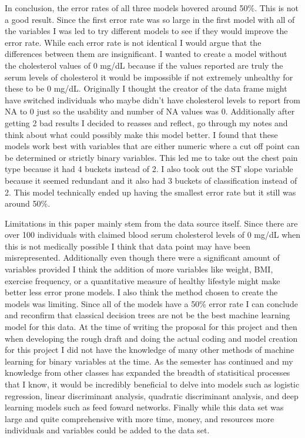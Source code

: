 \documentclass[12pt]{article}
\begin{document}
In conclusion, the error rates of all three models hovered around 50\%. This is not a good result. Since the first error rate was so large in the first model with all of the variables I was led to try different models to see if they would improve the error rate. While each error rate is not identical I would argue that the differences between them are insignificant. I wanted to create a model without the cholesterol values of 0 mg/dL because if the values reported are truly the serum levels of cholesterol it would be impossible if not extremely unhealthy for these to be 0 mg/dL. Originally I thought the creator of the data frame might have switched individuals who maybe didn’t have cholesterol levels to report from NA to 0 just so the usability and number of NA values was 0. Additionally after getting 2 bad results I decided to reasses and reflect, go through my notes and think about what could possibly make this model better. I found that these models work best with variables that are either numeric where a cut off point can be determined or strictly binary variables. This led me to take out the chest pain type because it had 4 buckets instead of 2. I also took out the ST slope variable because it seemed redundant and it also had 3 buckets of classification instead of 2. This model technically ended up having the smallest error rate but it still was around 50\%. \par 
Limitations in this paper mainly stem from the data source itself. Since there are over 100 individuals with claimed blood serum cholesterol levels of 0 mg/dL when this is not medically possible I think that data point may have been misrepresented. Additionally even though there were a significant amount of variables provided I think the addition of more variables like weight, BMI, exercise frequency, or a quantitative measure of healthy lifestyle might make better less error prone models. I also think the method chosen to create the models was limiting. Since all of the models have a 50\% error rate I can conclude and reconfirm that classical decision trees are not be the best machine learning model for this data. At the time of writing the proposal for this project and then when developing the rough draft and doing the actual coding and model creation for this project I did not have the knowledge of many other methods of machine learning for binary variables at the time. As the semester has continued and my knowledge from other classes has expanded the breadth of statisitical processes that I know, it would be incredibly beneficial to delve into models such as logistic regression, linear discriminant analysis, quadratic discriminant analysis, and deep learning models such as feed foward networks. Finally while this data set was large and quite comprehensive with more time, money, and resources more individuals and variables could be added to the data set. \par
\end{document}
